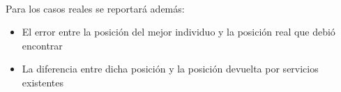 \documentclass[journal]{IEEEtran}
\begin{document}
~\\Para los casos reales se reportará además:\\

\begin{itemize}
\item El error entre la posición del mejor individuo y la posición real que debió encontrar
\item La diferencia entre dicha posición y la posición devuelta por servicios existentes
\end{itemize}

%
%



%
%
\end{document}

